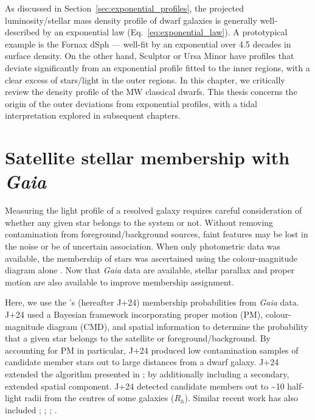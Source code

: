 As discussed in Section~\ref{sec:exponential_profiles}, the projected
luminosity/stellar mass density profile of dwarf galaxies is generally
well-described by an exponential law (Eq.~\ref{eq:exponential_law}). A
prototypical example is the Fornax dSph --- well-fit by an exponential
over 4.5 decades in surface density. On the other hand, Sculptor or Ursa
Minor have profiles that deviate significantly from an exponential
profile fitted to the inner regions, with a clear excess of stars/light
in the outer regions. In this chapter, we critically review the density
profile of the MW classical dwarfs. This thesis concerns the origin of
the outer deviations from exponential profiles, with a tidal
interpretation explored in subsequent chapters.

\section{\texorpdfstring{Satellite stellar membership with
\emph{Gaia}}{Satellite stellar membership with Gaia}}\label{sec:the_algorithm}

Measuring the light profile of a resolved galaxy requires careful
consideration of whether any given star belongs to the system or not.
Without removing contamination from foreground/background sources, faint
features may be lost in the noise or be of uncertain association. When
only photometric data was available, the membership of stars was
ascertained using the colour-magnitude diagram alone \citep[e.g.,
matched filter methods like those used by][]{rockosi+2002}. Now that
\emph{Gaia} data are available, stellar parallax and proper motion are
also available to improve membership assignment.

Here, we use the \citet{jensen+2024}'s (hereafter J+24) membership
probabilities from \emph{Gaia} data. J+24 used a Bayesian framework
incorporating proper motion (PM), colour-magnitude diagram (CMD), and
spatial information to determine the probability that a given star
belongs to the satellite or foreground/background. By accounting for PM
in particular, J+24 produced low contamination samples of candidate
member stars out to large distances from a dwarf galaxy. J+24 extended
the algorithm presented in \citet{MV2020a}; \citet{MV2020b} by
additionally including a secondary, extended spatial component. J+24
detected candidate members out to \textasciitilde10 half-light radii
from the centres of some galaxies (\(R_h\)). Similar recent work has
also included \citet{pace+li2019}; \citet{battaglia+2022};
\citet{pace+erkal+li2022}; \citet{qi+2022}.

